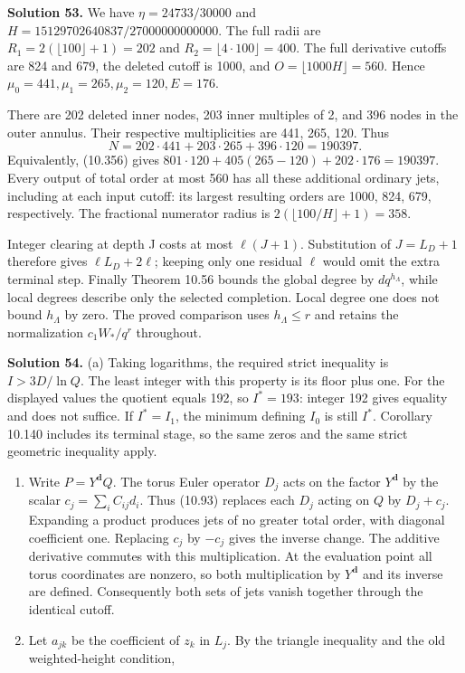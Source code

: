 \documentclass[
  11pt,
  a4paper,
]{article}
\begin{document}
\textbf{Solution 53.} We have \(\eta=24733/30000\) and
\(H=15129702640837/27000000000000\). The full radii are
\(R_1=2(\lfloor100\rfloor+1)=202\) and
\(R_2=\lfloor4\cdot100\rfloor=400\). The full derivative cutoffs are 824
and 679, the deleted cutoff is 1000, and \(O=\lfloor1000H\rfloor=560\).
Hence \(\mu_0=441,\mu_1=265,\mu_2=120,E=176\).

There are 202 deleted inner nodes, 203 inner multiples of 2, and 396
nodes in the outer annulus. Their respective multiplicities are 441,
265, 120. Thus \[
N=202\cdot441+203\cdot265+396\cdot120=190397.
\] Equivalently, (10.356) gives
\(801\cdot120+405(265-120)+202\cdot176=190397\). Every output of total
order at most 560 has all these additional ordinary jets, including at
each input cutoff: its largest resulting orders are 1000, 824, 679,
respectively. The fractional numerator radius is
\(2(\lfloor100/H\rfloor+1)=358\).

Integer clearing at depth J costs at most \(\ell(J+1)\). Substitution of
\(J=L_D+1\) therefore gives \(\ell L_D+2\ell\); keeping only one
residual \(\ell\) would omit the extra terminal step. Finally Theorem
10.56 bounds the global degree by \(dq^{h_\Lambda}\), while local
degrees describe only the selected completion. Local degree one does not
bound \(h_\Lambda\) by zero. The proved comparison uses
\(h_\Lambda\le r\) and retains the normalization \(c_1W_*/q^r\)
throughout.

\textbf{Solution 54.} (a) Taking logarithms, the required strict
inequality is \(I>3D/\ln Q\). The least integer with this property is
its floor plus one. For the displayed values the quotient equals 192, so
\(I^*=193\): integer 192 gives equality and does not suffice. If
\(I^*=I_1\), the minimum defining \(I_0\) is still \(I^*\). Corollary
10.140 includes its terminal stage, so the same zeros and the same
strict geometric inequality apply.

\begin{enumerate}
\def\labelenumi{(\alph{enumi})}
\setcounter{enumi}{1}
\item
  Write \(P=Y^{\boldsymbol d}Q\). The torus Euler operator \(D_j\) acts
  on the factor \(Y^{\boldsymbol d}\) by the scalar
  \(c_j=\sum_iC_{ij}d_i\). Thus (10.93) replaces each \(D_j\) acting on
  \(Q\) by \(D_j+c_j\). Expanding a product produces jets of no greater
  total order, with diagonal coefficient one. Replacing \(c_j\) by
  \(-c_j\) gives the inverse change. The additive derivative commutes
  with this multiplication. At the evaluation point all torus
  coordinates are nonzero, so both multiplication by
  \(Y^{\boldsymbol d}\) and its inverse are defined. Consequently both
  sets of jets vanish together through the identical cutoff.
\item
  Let \(a_{jk}\) be the coefficient of \(z_k\) in \(L_j\). By the
  triangle inequality and the old weighted-height condition,
\end{enumerate}
\end{document}
